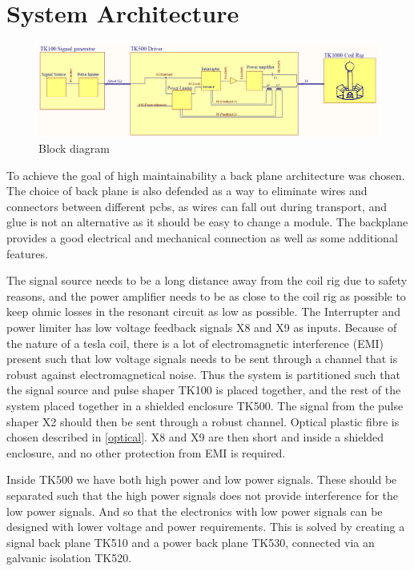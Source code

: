 \section{System Architecture}
\label{sa}

\begin{figure}
    \centering
    \includegraphics[width=\textwidth]{img/Blokkdiagram_detalj.PNG}
    \caption{Block diagram}
    \label{fig:blokksjema}
\end{figure}
To achieve the goal of high maintainability a back plane architecture was chosen. The choice of back plane is also defended as a way to eliminate wires and connectors between different pcbs, as wires can fall out during transport, and glue is not an alternative as it should be easy to change a module. The backplane provides a good electrical and mechanical connection as well as some additional features. 

The signal source needs to be a long distance away from the coil rig due to safety reasons, and the power amplifier needs to be as close to the coil rig as possible to keep ohmic losses in the resonant circuit as low as possible. The Interrupter and power limiter has low voltage feedback signals X8 and X9 as inputs. Because of the nature of a tesla coil, there is a lot of electromagnetic interference (EMI) present such that low voltage signals needs to be sent through a channel that is robust against electromagnetical noise. Thus the system is partitioned such that the signal source and pulse shaper TK100 is placed together, and the rest of the system placed together in a shielded enclosure TK500. The signal from the pulse shaper X2 should then be sent through a robust channel. Optical plastic fibre is chosen described in \cref{optical}. X8 and X9 are then short and inside a shielded enclosure, and no other protection from EMI is required.

Inside TK500 we have both high power and low power signals. These should be separated such that the high power signals does not provide interference for the low power signals. And so that the electronics with low power signals can be designed with lower voltage and power requirements. This is solved by creating a signal back plane TK510 and a power back plane TK530, connected via an galvanic isolation TK520.

